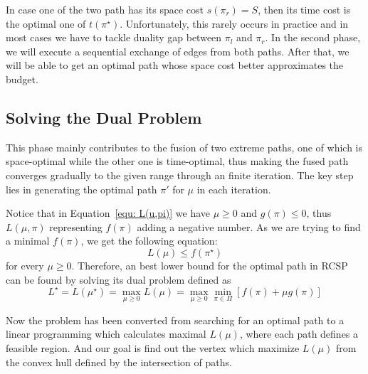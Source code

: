 \documentclass{sig-alternate-05-2015}
\begin{document}
In case one of the two path has its space cost $ s(\pi_r) = S $, then its time cost is the optimal one of $ t(\pi^\star) $.
Unfortunately, this rarely occurs in practice and in most cases we have to tackle duality gap between $ \pi_l $ and $ \pi_r $.
In the second phase, we will execute a sequential exchange of edges from both paths.
After that, we will be able to get an optimal path whose space cost better approximates the budget.

\subsection{Solving the Dual Problem}
This phase mainly contributes to the fusion of two extreme paths, one of which is space-optimal while the other one is time-optimal, thus making the fused path converges gradually to the given range through an finite iteration.
The key step lies in generating the optimal path $ \pi' $ for $ \mu $ in each iteration.

Notice that in Equation~\eqref{equ: L(u,pi)} we have $ \mu \geqslant 0 $ and $ g(\pi) \leqslant 0 $, thus $ L(\mu,\pi) $ representing $ f(\pi) $ adding a negative number.
As we are trying to find a minimal $ f(\pi) $, we get the following equation:
\begin{equation}
L(\mu) \leqslant f(\pi^\star) \label{equ: maximum}
\end{equation}
\noindent for every $ \mu \geqslant 0 $.
Therefore, an best lower bound for the optimal path in RCSP can be found by solving its dual problem defined as 
\begin{equation}
L^\star = L(\mu^\star) = \max_{\mu \geqslant 0} L(\mu) =\max_{\mu \geqslant 0} \min_{\pi \in \Pi} \left[ f(\pi) + \mu g(\pi) \right]
\end{equation}

Now the problem has been converted from searching for an optimal path to a linear programming which calculates maximal $ L(\mu) $, where each path defines a feasible region.
And our goal is find out the vertex which maximize $ L(\mu) $ from the convex hull defined by the intersection of paths.
\end{document}
